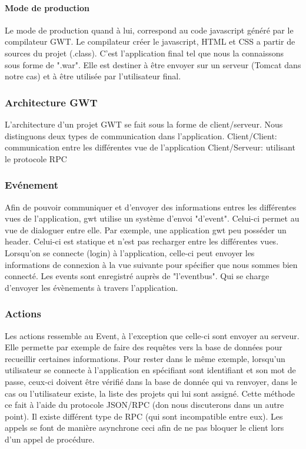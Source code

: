 \paragraph{Mode de production}
Le mode de production quand à lui, correspond au code javascript généré par le compilateur GWT. Le compilateur créer le javascript, HTML et CSS a partir de sources du projet (.class). C'est l'application final tel que nous la connaissons sous forme de ".war". Elle est destiner à être envoyer sur un serveur (Tomcat dans notre cas) et à être utilisée par l'utilisateur final.

\subsubsection{Architecture GWT}
L'architecture d'un projet GWT se fait sous la forme de client/serveur. Nous distinguons deux types de communication dans l'application.
Client/Client: communication entre les différentes vue de l'application
Client/Serveur: utilisant le protocole RPC 

\subsubsection{Evénement}
Afin de pouvoir communiquer et d'envoyer des informations entres les différentes vues de l'application, gwt utilise un système d'envoi "d'event". Celui-ci permet au vue de dialoguer entre elle.
Par exemple, une application gwt peu posséder un header. Celui-ci est statique et n'est pas recharger entre les différentes vues. Lorsqu'on se connecte (login) à l'application, celle-ci peut envoyer les informations de connexion à la vue suivante pour spécifier que nous sommes bien connecté.
Les events sont enregistré auprès de "l'eventbus". Qui se charge d'envoyer les évènements à travers l'application.

\subsubsection{Actions}
Les actions ressemble au Event, à l'exception que celle-ci sont envoyer au serveur. Elle permette par exemple de faire des requêtes vers la base de données pour recueillir certaines informations. Pour rester dans le même exemple, lorsqu'un utilisateur se connecte à l'application en spécifiant sont identifiant et son mot de passe, ceux-ci doivent être vérifié dans la base de donnée qui va renvoyer, dans le cas ou l'utilisateur existe, la liste des projets qui lui sont assigné. Cette méthode ce fait à l'aide du protocole JSON/RPC (don nous discuterons dans un autre point). Il existe différent type de RPC (qui sont incompatible entre eux). Les appels se font de manière asynchrone ceci afin de ne pas bloquer le client lors d'un appel de procédure.


